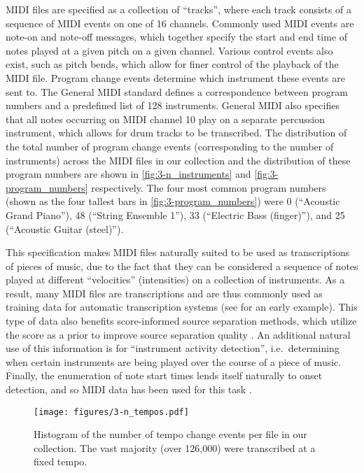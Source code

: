 MIDI files are specified as a collection of ``tracks'', where each track consists of a sequence of MIDI events on one of 16 channels.
Commonly used MIDI events are note-on and note-off messages, which together specify the start and end time of notes played at a given pitch on a given channel.
Various control events also exist, such as pitch bends, which allow for finer control of the playback of the MIDI file.
Program change events determine which instrument these events are sent to.
The General MIDI standard defines a correspondence between program numbers and a predefined list of 128 instruments.
General MIDI also specifies that all notes occurring on MIDI channel 10 play on a separate percussion instrument, which allows for drum tracks to be transcribed.
The distribution of the total number of program change events (corresponding to the number of instruments) across the MIDI files in our collection and the distribution of these program numbers are shown in \cref{fig:3-n_instruments} and \cref{fig:3-program_numbers} respectively.
The four most common program numbers (shown as the four tallest bars in \cref{fig:3-program_numbers}) were 0 (``Acoustic Grand Piano''), 48 (``String Ensemble 1''), 33 (``Electric Bass (finger)''), and 25 (``Acoustic Guitar (steel)'').

This specification makes MIDI files naturally suited to be used as transcriptions of pieces of music, due to the fact that they can be considered a sequence of notes played at different ``velocities'' (intensities) on a collection of instruments.
As a result, many MIDI files are transcriptions and are thus commonly used as training data for automatic transcription systems (see \cite{turetsky2003ground} for an early example).
This type of data also benefits score-informed source separation methods, which utilize the score as a prior to improve source separation quality \cite{ewert2014score}.
An additional natural use of this information is for ``instrument activity detection'', i.e.\ determining when certain instruments are being played over the course of a piece of music.
Finally, the enumeration of note start times lends itself naturally to onset detection, and so MIDI data has been used for this task \cite{bello2005tutorial}.

\begin{figure}
  \centering
  \texttt{[image: figures/3-n\_tempos.pdf]}
  \caption[Histogram of the number of tempo changes in MIDI files]{Histogram of the number of tempo change events per file in our collection.
The vast majority (over 126,000) were transcribed at a fixed tempo.}
    \label{fig:3-n_tempos}
\end{figure}

